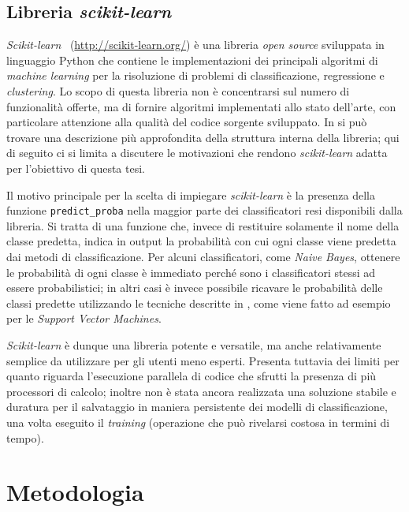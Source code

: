 \documentclass[12pt,a4paper,oneside]{article}
\begin{document}
\subsection{Libreria \mbox{\textit{scikit-learn}}}

\mbox{\textit{Scikit-learn}}~\cite{SCIKIT} (\url{http://scikit-learn.org/}) è una libreria \textit{open source} sviluppata in linguaggio Python che contiene le implementazioni dei principali algoritmi di \textit{machine learning} per la risoluzione di problemi di classificazione, regressione e \textit{clustering}. Lo scopo di questa libreria non è concentrarsi sul numero di funzionalità offerte, ma di fornire algoritmi implementati allo stato dell'arte, con particolare attenzione alla qualità del codice sorgente sviluppato. In \cite{SCIKIT_API} si può trovare una descrizione più approfondita della struttura interna della libreria; qui di seguito ci si limita a discutere le motivazioni che rendono \mbox{\textit{scikit-learn}} adatta per l'obiettivo di questa tesi.

Il motivo principale per la scelta di impiegare \mbox{\textit{scikit-learn}} è la presenza della funzione \texttt{predict\_proba} nella maggior parte dei classificatori resi disponibili dalla libreria. Si tratta di una funzione che, invece di restituire solamente il nome della classe predetta, indica in output la probabilità con cui ogni classe viene predetta dai metodi di classificazione. Per alcuni classificatori, come \textit{Naive Bayes}, ottenere le probabilità di ogni classe è immediato perché sono i classificatori stessi ad essere probabilistici; in altri casi è invece possibile ricavare le probabilità delle classi predette utilizzando le tecniche descritte in \cite{GET_PROBABILITIES}, come viene fatto ad esempio per le \textit{Support Vector Machines}.

\mbox{\textit{Scikit-learn}} è dunque una libreria potente e versatile, ma anche relativamente semplice da utilizzare per gli utenti meno esperti. Presenta tuttavia dei limiti per quanto riguarda l'esecuzione parallela di codice che sfrutti la presenza di più processori di calcolo; inoltre non è stata ancora realizzata una soluzione stabile e duratura per il salvataggio in maniera persistente dei modelli di classificazione, una volta eseguito il \textit{training} (operazione che può rivelarsi costosa in termini di tempo).
\newpage





\section{Metodologia}\label{sec:Metodologia}
\end{document}
